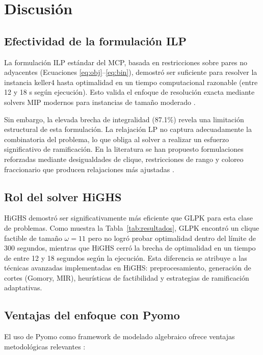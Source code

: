 \section{Discusión}

\subsection{Efectividad de la formulación ILP}

La formulación ILP estándar del MCP, basada en restricciones sobre pares no adyacentes (Ecuaciones \eqref{eq:obj}--\eqref{eq:bin}), demostró ser suficiente para resolver la instancia keller4 hasta optimalidad en un tiempo computacional razonable (entre 12 y 18 s según ejecución). Esto valida el enfoque de resolución exacta mediante solvers MIP modernos para instancias de tamaño moderado \parencite{wolsey1998}.

Sin embargo, la elevada brecha de integralidad (87.1\%) revela una limitación estructural de esta formulación. La relajación LP no captura adecuadamente la combinatoria del problema, lo que obliga al solver a realizar un esfuerzo significativo de ramificación. En la literatura se han propuesto formulaciones reforzadas mediante desigualdades de clique, restricciones de rango y coloreo fraccionario que producen relajaciones más ajustadas \parencite{bomze1999, schrijver1986}.

\subsection{Rol del solver HiGHS}

HiGHS \parencite{highs2024} demostró ser significativamente más eficiente que GLPK para esta clase de problemas. Como muestra la Tabla~\ref{tab:resultados}, GLPK encontró un clique factible de tamaño $\omega = 11$ pero no logró probar optimalidad dentro del límite de 300 segundos, mientras que HiGHS cerró la brecha de optimalidad en un tiempo de entre 12 y 18 segundos según la ejecución. Esta diferencia se atribuye a las técnicas avanzadas implementadas en HiGHS: preprocesamiento, generación de cortes (Gomory, MIR), heurísticas de factibilidad y estrategias de ramificación adaptativas.

\subsection{Ventajas del enfoque con Pyomo}

El uso de Pyomo como framework de modelado algebraico ofrece ventajas metodológicas relevantes \parencite{pyomo2021}:

